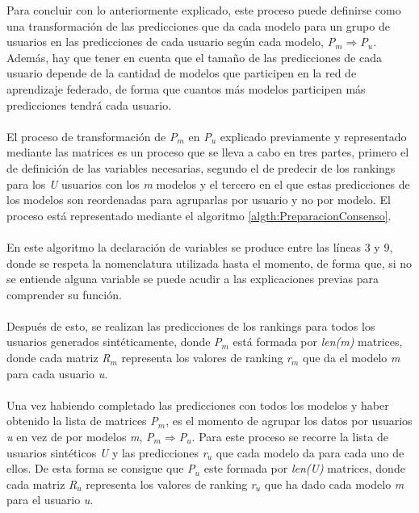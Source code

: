 Para concluir con lo anteriormente explicado, este proceso puede definirse como una transformación de las predicciones que da cada modelo para un grupo de usuarios en las predicciones de cada usuario según cada modelo, \textit{P$_{m}$}$\Longrightarrow $\textit{P$_{u}$}. Además, hay que tener en cuenta que el tamaño de las predicciones de cada usuario depende de la cantidad de modelos que participen en la red de aprendizaje federado, de forma que cuantos más modelos participen más predicciones tendrá cada usuario. 
\\ \\
El proceso de transformación de \textit{P$_{m}$} en \textit{P$_{u}$} explicado previamente y representado mediante las matrices es un proceso que se lleva a cabo en tres partes, primero el de definición de las variables necesarias, segundo el de predecir de los rankings para los \textit{U} usuarios con los \textit{m} modelos y el tercero en el que estas predicciones de los modelos son reordenadas para agruparlas por usuario y no por modelo. El proceso está representado mediante el algoritmo \ref{algth:PreparacionConsenso}.
\\ \\
En este algoritmo la declaración de variables se produce entre las líneas 3 y 9, donde se respeta la nomenclatura utilizada hasta el momento, de forma que, si no se entiende alguna variable se puede acudir a las explicaciones previas para comprender su función. 
\\ \\
Después de esto, se realizan las predicciones de los rankings para todos los usuarios generados sintéticamente, donde \textit{P$_{m}$} está formada por \textit{len(m)} matrices, donde cada matriz \textit{R$_{m}$} representa los valores de ranking \textit{r$_{m}$} que da el modelo \textit{m} para cada usuario \textit{u}.
\\ \\
Una vez habiendo completado las predicciones con todos los modelos y haber obtenido la lista de matrices \textit{P$_{m}$}, es el momento de agrupar los datos por usuarios \textit{u} en vez de por modelos \textit{m}, \textit{P$_{m}$}$\Longrightarrow $\textit{P$_{u}$}. Para este proceso se recorre la lista de usuarios sintéticos \textit{U} y las predicciones \textit{r$_{u}$} que cada modelo da para cada uno de ellos. De esta forma se consigue que \textit{P$_{u}$} este formada por \textit{len(U)} matrices, donde cada matriz \textit{R$_{u}$} representa los valores de ranking \textit{r$_{u}$} que ha dado cada modelo \textit{m} para el usuario \textit{u}. 

